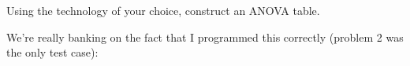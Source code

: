 Using the technology of your choice, construct an ANOVA table.

\soln* We're really banking on the fact that I programmed this correctly (problem 2 was the only test case):

